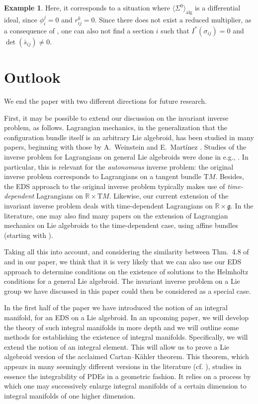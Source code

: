 \documentclass[11pt]{article}
\theoremstyle{plain}
\theoremstyle{definition}
\newtheorem{example}{Example}
\begin{document}
\begin{example}
Here, it corresponds to a situation where $\langle \Sigma^0\rangle_{\mathrm{alg}}$ is a differential ideal, since $\phi_i^j=0$ and $r_{ij}^k=0$. Since there does not exist a reduced multiplier, as a consequence of , one can also not find a section $i$ such that $I^{\ast}(\sigma_{ij})=0$ and $\det(\bar{s}_{ij})\neq 0$.
\end{example}

\section{Outlook}\label{sec:outlook}
We end the paper with two different directions for future research. 

First, it may be possible to extend our discussion on the invariant inverse problem, as follows. Lagrangian mechanics, in the generalization that the configuration bundle itself is an arbitrary Lie algebroid, has been studied in many papers, beginning with those by A.\ Weinstein \cite{weinstein1996lagrangian} and E.\ Mart\'inez \cite{martinez2001lagrangeliealgebroid}. Studies of the inverse problem for Lagrangians on general Lie
algebroids were done in e.g., \cite{barbero2016invproblemliealgebroids,  popescu2011metric, popescu2014invproblemliealgebroids}. In particular, this is relevant for the  \emph{autonomous} inverse problem: the original inverse problem corresponds to Lagrangians on a tangent bundle $\mathrm{T}M$.  Besides, the EDS approach to the original inverse problem typically makes use of  \emph{time-dependent} Lagrangians on $\mathbb R\times\mathrm{T}M$. Likewise, our current extension of the invariant inverse problem deals with time-dependent Lagrangians on $\mathbb{R}\times \mathfrak{g}$. In the literature, one may also find many papers on the extension of Lagrangian mechanics on Lie algebroids to the time-dependent case,  using affine bundles (starting with  \cite{martinez2002prolongation}). 

Taking all this into account, and considering the similarity between Thm.\ 4.8 of \cite{barbero2016invproblemliealgebroids} and  in our paper, we think that it is very likely that we can also use our EDS approach to determine conditions on the existence of solutions to the Helmholtz conditions for a general Lie algebroid. The invariant inverse problem on a Lie group we have discussed in this paper could then be considered as a special case.

In the first half of the paper we have introduced the notion of an integral manifold, for an EDS on a Lie algebroid. In an upcoming paper, we will develop the theory of such integral manifolds in more depth and we will outline some methods for establishing the existence of integral manifolds. Specifically, we will extend the notion of an integral element. This will allow us to prove a Lie algebroid version of the acclaimed Cartan--K{\"a}hler theorem. This theorem, which appears in many seemingly different versions in the literature (cf. \cite{bryant1991exterior,ivey2016cartan}), studies in essence the integrability of PDEs in a geometric fashion. It relies on a process by which one may successively enlarge integral manifolds of a certain dimension to integral manifolds of one higher dimension. 
\end{document}
